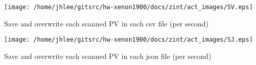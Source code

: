 \noindent
\vspace{1.4cm}
\begin{minipage}{.2\textwidth}
\begin{center}
\texttt{[image: /home/jhlee/gitsrc/hw-xenon1900/docs/zint/act\_images/SV.eps]}
\end{center}
\end{minipage}
\begin{minipage}{.7\textwidth}
Save and overwrite each scanned PV in each csv file (per second)
\end{minipage}


\noindent
\vspace{1.4cm}
\begin{minipage}{.2\textwidth}
\begin{center}
\texttt{[image: /home/jhlee/gitsrc/hw-xenon1900/docs/zint/act\_images/SJ.eps]}
\end{center}
\end{minipage}
\begin{minipage}{.7\textwidth}
Save and overwrite each scanned PV in each json file (per second)
\end{minipage}


